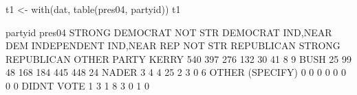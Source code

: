 \begin{Schunk}
\begin{Sinput}
 t1 <- with(dat, table(pres04, partyid))
 t1
\end{Sinput}
\begin{Soutput}
                 partyid
pres04            STRONG DEMOCRAT NOT STR DEMOCRAT IND,NEAR DEM INDEPENDENT IND,NEAR REP NOT STR REPUBLICAN STRONG REPUBLICAN OTHER PARTY
  KERRY                       540              397          276         132           30                 41                 8           9
  BUSH                         25               99           48         168          184                445               448          24
  NADER                         3                4            4          25            2                  3                 0           6
  OTHER (SPECIFY)               0                0            0           0            0                  0                 0           0
  DIDNT VOTE                    1                3            1           8            3                  0                 1           0
\end{Soutput}
\end{Schunk}
